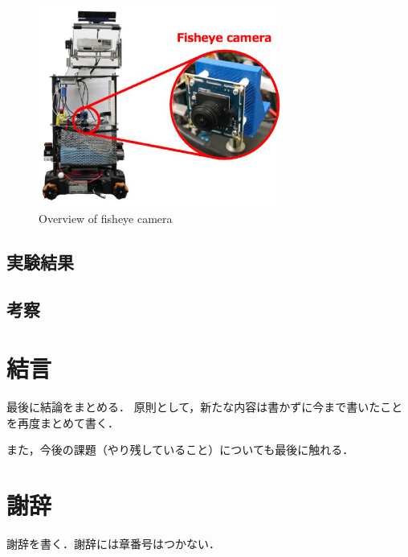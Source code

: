 \documentclass[12pt]{sonota/aislab}
\begin{document}
\begin{figure}[t]
\begin{center}
\includegraphics[clip, width=8cm]{figs/ud_with_fisheyecamera.eps}
\caption{Overview of fisheye camera}
\label{ud_with_fisheyecamera}
\end{center}
\end{figure}

\section{実験結果}
\section{考察}

\chapter{結言}
最後に結論をまとめる．
原則として，新たな内容は書かずに今まで書いたことを再度まとめて書く．

また，今後の課題（やり残していること）についても最後に触れる．

\chapter*{謝辞}
謝辞を書く．謝辞には章番号はつかない．

\end{document}

